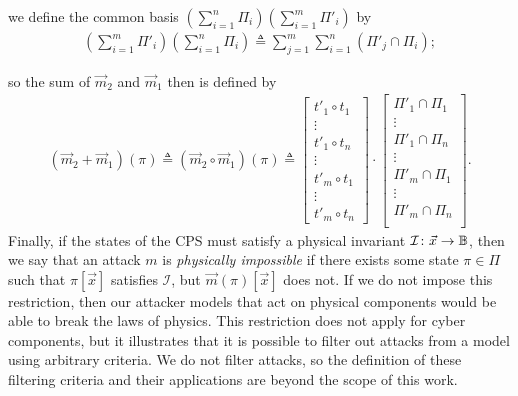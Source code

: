 {\begin{definition}[Attack]
we define the common basis $(\sum_{i=1}^n\Pi_i)(\sum_{i=1}^m\Pi'_i)$ by 
\begin{align}
  \left(\sum_{i=1}^m\Pi'_i\right)\left(\sum_{i=1}^n\Pi_i\right)\triangleq \sum_{j=1}^m\sum_{i=1}^n(\Pi'_j\cap\Pi_i);
\end{align}

so the sum of $\vec{m}_2$ and $\vec{m}_1$ then is defined by
\begin{align}
  (\vec{m}_2+\vec{m}_1)(\pi)\triangleq(\vec{m}_2\circ\vec{m}_1)(\pi)\triangleq
  \begin{bmatrix}
    t'_{1}\circ t_1 \\
    \vdots \\
    t'_{1}\circ t_n\\
    \vdots \\
    t'_{m}\circ t_1 \\
    \vdots \\
    t'_{m}\circ t_n
  \end{bmatrix}
  \cdot
  \begin{bmatrix}
    \Pi'_{1}\cap\Pi_{1} \\
    \vdots \\
    \Pi'_{1}\cap\Pi_{n}\\
    \vdots \\
    \Pi'_{m}\cap\Pi_{1} \\
    \vdots \\
    \Pi'_{m}\cap\Pi_{n}\\
  \end{bmatrix}.
\end{align} 
Finally, if the states of the CPS must satisfy a physical invariant $\mathcal{I}\colon \vec{x}\rightarrow{\mathbb{B}}$, then we say that an attack $m$ is \emph{physically impossible} if there exists some state $\pi\in \Pi$ such that $\pi[\vec{x}]$ satisfies $\mathcal{I}$, but $\vec{m}(\pi)[\vec{x}]$ does not. If we do not impose this restriction, then our attacker models that act on physical components would be able to break the laws of physics. This restriction does not apply for cyber components, but it illustrates that it is possible to filter out attacks from a model using arbitrary criteria. We do not filter attacks, so the definition of these filtering criteria and their applications are beyond the scope of this work. 
\end{definition}

}
